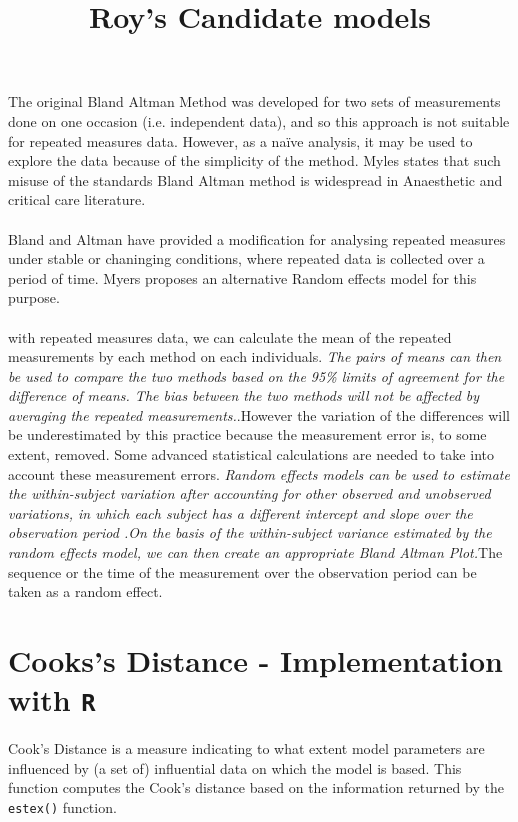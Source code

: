 \documentclass[12pt, a4paper]{report}
\theoremstyle{plain}
\theoremstyle{definition}
\theoremstyle{remark}
\begin{document}
\title{Roy's Candidate models}
The original Bland Altman Method was developed for two sets of
measurements done on one occasion (i.e. independent data), and so
this approach is not suitable for repeated measures data. However,
as a naïve analysis, it may be used to explore the data because of
the simplicity of the method. Myles states that such misuse of the
standards Bland Altman method is widespread in Anaesthetic and
critical care literature.
\\
\\
Bland and Altman have provided a modification for analysing
repeated measures under stable or chaninging conditions, where
repeated data is collected over a period of time. Myers proposes
an alternative Random effects model for this purpose.
\\
\\
with repeated measures data, we can
calculate the mean of the repeated measurements by each method on
each individuals. \emph{ The pairs of means can then be used to
	compare the two methods based on the 95\% limits of agreement for
	the difference of means. The bias between the two methods will not
	be affected by averaging the repeated measurements.}.However the
variation of the differences will be underestimated by this
practice because the measurement error is, to some extent,
removed. Some advanced statistical calculations are needed to take
into account these measurement errors. \emph{Random effects models
	can be used to estimate the within-subject variation after
	accounting for other observed and unobserved variations, in which
	each subject has a different intercept and slope over the
	observation period .On the basis of the within-subject variance
	estimated by the random effects model, we can then create an
	appropriate Bland Altman Plot.}The sequence or the time of the
measurement over the observation period can be taken as a random
effect.



	\section{Cooks's Distance - Implementation with \texttt{R}}
	Cook's Distance is a measure indicating to what extent model parameters are influenced by (a set of) influential data on which the model is based. This function computes the Cook's distance based on the information returned by the \texttt{estex()} function.
	
	
\end{document}
